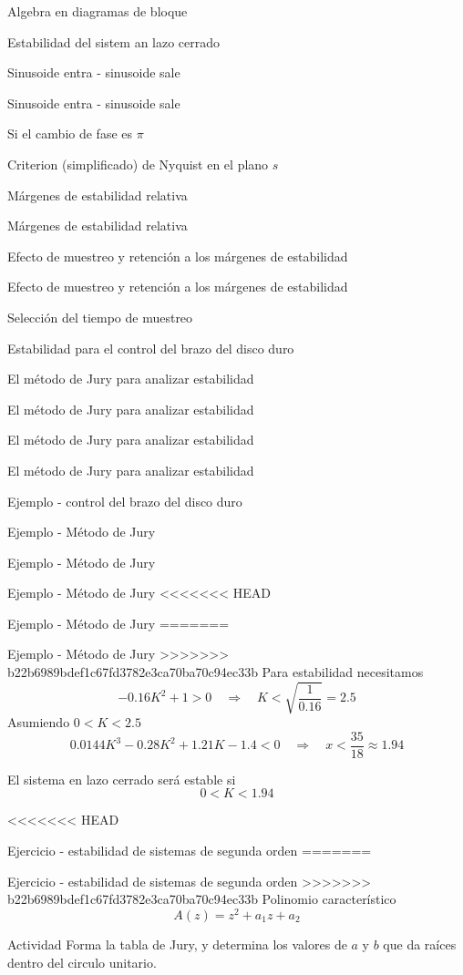 \documentclass[presentation,aspectratio=169]{beamer}
\begin{document}
\begin{frame}[label={sec:org8e8e439}]{Algebra en diagramas de bloque}
\begin{frame}[label={sec:org5218f19}]{Estabilidad del sistem an lazo cerrado}
\begin{frame}[label={sec:org4ce2307}]{Sinusoide entra - sinusoide sale}
\begin{frame}[label={sec:orgc598966}]{Sinusoide entra - sinusoide sale}
\begin{frame}[label={sec:orgbd54147}]{Si el cambio de fase es \(\pi\)}
\begin{frame}[label={sec:orgf06388b}]{Criterion (simplificado) de Nyquist en el plano \(s\)}
\begin{frame}[label={sec:org5967884}]{Márgenes de estabilidad relativa}
\begin{frame}[label={sec:orgb5ba0e3}]{Márgenes de estabilidad relativa}
\begin{frame}[label={sec:orga8344a9}]{Efecto de muestreo y retención a los márgenes de estabilidad}
\begin{frame}[label={sec:org5e3653d}]{Efecto de muestreo y retención a los márgenes de estabilidad}
\begin{frame}[label={sec:orgd9a9d5d}]{Selección del tiempo de muestreo}
\begin{frame}[label={sec:org2cdebfb}]{Estabilidad para el control del brazo del disco duro}
\begin{frame}[label={sec:org6242817}]{El método de Jury para analizar estabilidad}
\begin{frame}[label={sec:org7c040d1}]{El método de Jury para analizar estabilidad}
\begin{frame}[label={sec:org85b11cd}]{El método de Jury para analizar estabilidad}
\begin{frame}[label={sec:org8bd183d}]{El método de Jury para analizar estabilidad}
\begin{frame}[label={sec:org4ec96eb}]{Ejemplo - control del brazo del disco duro}
\begin{frame}[label={sec:orgd803867}]{Ejemplo - Método de Jury}
\begin{frame}[label={sec:org8c0436d}]{Ejemplo - Método de Jury}
\begin{frame}[label={sec:org7f8ec49}]{Ejemplo - Método de Jury}
<<<<<<< HEAD
\begin{frame}[label={sec:org3031e62}]{Ejemplo - Método de Jury}
=======
\begin{frame}[label={sec:org845c1a3}]{Ejemplo - Método de Jury}
>>>>>>> b22b6989bdef1c67fd3782e3ca70ba70c94ec33b
Para estabilidad necesitamos
\[ -0.16K^2 + 1 > 0 \quad \Rightarrow \quad K < \sqrt{\frac{1}{0.16}} = 2.5\]
Asumiendo  \(0<K<2.5\)
\[ 0.0144K^3 - 0.28K^2 + 1.21K - 1.4 < 0 \quad \Rightarrow \quad x < \frac{35}{18} \approx 1.94\] 

\begin{tcolorbox}
 El sistema en lazo cerrado será estable si \[ 0 < K < 1.94\]
\end{tcolorbox}
\end{frame}

<<<<<<< HEAD
\begin{frame}[label={sec:org228180a}]{Ejercicio - estabilidad de sistemas de segunda orden}
=======
\begin{frame}[label={sec:org421af03}]{Ejercicio - estabilidad de sistemas de segunda orden}
>>>>>>> b22b6989bdef1c67fd3782e3ca70ba70c94ec33b
Polinomio característico \[A(z) = z^2 + a_1z + a_2\]

\alert{Actividad} Forma la tabla de Jury, y determina los valores de \(a\) y \(b\) que da raíces dentro del circulo unitario.


\end{frame}
\end{frame}
\end{frame}
\end{frame}
\end{frame}
\end{frame}
\end{frame}
\end{frame}
\end{frame}
\end{frame}
\end{frame}
\end{frame}
\end{frame}
\end{frame}
\end{frame}
\end{frame}
\end{frame}
\end{frame}
\end{frame}
\end{frame}
\end{frame}
\end{frame}
\end{frame}
\end{document}

